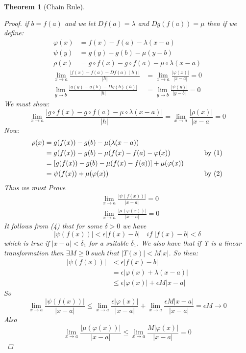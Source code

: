 \documentclass[11pt]{article}
\newtheorem{theorem}{Theorem}[section]
\begin{document}
\begin{theorem}[Chain Rule]
\begin{proof}
if $b=f(a)$ and we let $Df(a) = \lambda$ and $Dg(f(a))=\mu$ then if we define:
\begin{align}
\varphi(x) &=f(x)-f(a) -\lambda(x-a)\\
\psi(y) &= g(y) - g(b) - \mu(y-b)\\
\rho(x) &= g\circ f(x) - g\circ f(a) - \mu \circ \lambda (x -a)
\end{align}
\begin{align}
\lim_{x \to a}\frac{|f(x)-f(a) -Df(a)(h)|}{|h|} &= \lim_{x \to a}\frac{|\varphi(x)|}{|x-a|} = 0\\
\lim_{y \to b}\frac{|g(y)-g(b) -Dg(b)(h)|}{|h|} &= \lim_{y \to b}\frac{|\psi(y)|}{|y-b|} = 0
\end{align}
We must show:
\[\lim_{x \to a}\frac{|g\circ f(x) - g\circ f(a) - \mu \circ \lambda (x -a)|}{|h|} = \lim_{x \to a}\frac{|\rho(x)|}{|x-a|} = 0\]
Now:
\begin{alignat*}{2}
\rho(x) &=g(f(x)) - g(b) - \mu(\lambda(x-a)) &\qquad & \\
&= g(f(x)) - g(b) - \mu(f(x) - f(a) - \varphi(x)) &\qquad & \textmd{by (1)}\\
&= [g(f(x)) - g(b) - \mu(f(x)-f(a))] + \mu(\varphi(x)) &\qquad &\\
&= \psi(f(x)) + \mu(\varphi(x)) &\qquad & \textmd{by (2)}
\end{alignat*}
Thus we must Prove
\begin{align}
&\lim_{x \to a}\frac{|\psi(f(x))|}{|x-a|} = 0\\
&\lim_{x \to a}\frac{|\mu(\varphi(x))|}{|x-a|} = 0
\end{align}
It follows from (4) that for some $\delta > 0 $  we have
\[|\psi(f(x))|<\epsilon|f(x) - b| \quad if\; |f(x) - b|<\delta\]
which is true if $|x-a|< \delta_{1} $ for a suitable $\delta_{1}$. We also have that if T is a linear transformation then $\exists M \geq 0\; such \; that\;  |T(x)|<M|x|$. So then:
\begin{align*}
|\psi(f(x))| &<\epsilon|f(x) - b| \\
&= \epsilon|\varphi(x) + \lambda(x-a)|\\
& \leq \epsilon|\varphi(x)| + \epsilon M|x-a|
\end{align*}
So
\[\lim_{x \to a}\frac{|\psi(f(x))|}{|x-a|} \leq \lim_{x \to a}\frac{\epsilon|\varphi(x)|}{|x-a|}  + \lim_{x \to a}\frac{\epsilon M|x-a|}{|x-a|} = \epsilon M \rightarrow 0\]
Also
\[\lim_{x \to a}\frac{|\mu(\varphi(x))|}{|x-a|} \leq \lim_{x \to a}\frac{M|\varphi(x)|}{|x-a|} = 0\]
\end{proof}
\end{theorem}
\end{document}
